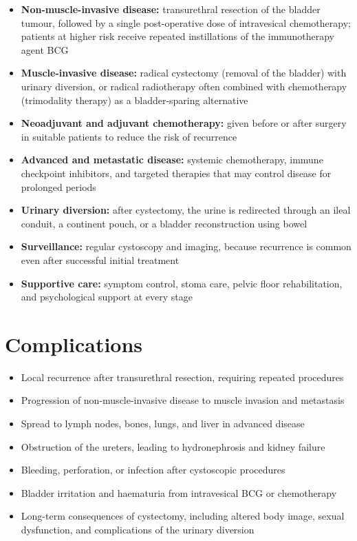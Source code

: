 \begin{itemize}
    \item \textbf{Non-muscle-invasive disease:} transurethral resection of the bladder tumour, followed by a single post-operative dose of intravesical chemotherapy; patients at higher risk receive repeated instillations of the immunotherapy agent BCG
    \item \textbf{Muscle-invasive disease:} radical cystectomy (removal of the bladder) with urinary diversion, or radical radiotherapy often combined with chemotherapy (trimodality therapy) as a bladder-sparing alternative
    \item \textbf{Neoadjuvant and adjuvant chemotherapy:} given before or after surgery in suitable patients to reduce the risk of recurrence
    \item \textbf{Advanced and metastatic disease:} systemic chemotherapy, immune checkpoint inhibitors, and targeted therapies that may control disease for prolonged periods
    \item \textbf{Urinary diversion:} after cystectomy, the urine is redirected through an ileal conduit, a continent pouch, or a bladder reconstruction using bowel
    \item \textbf{Surveillance:} regular cystoscopy and imaging, because recurrence is common even after successful initial treatment
    \item \textbf{Supportive care:} symptom control, stoma care, pelvic floor rehabilitation, and psychological support at every stage
\end{itemize}

\section*{Complications}
\begin{itemize}
    \item Local recurrence after transurethral resection, requiring repeated procedures
    \item Progression of non-muscle-invasive disease to muscle invasion and metastasis
    \item Spread to lymph nodes, bones, lungs, and liver in advanced disease
    \item Obstruction of the ureters, leading to hydronephrosis and kidney failure
    \item Bleeding, perforation, or infection after cystoscopic procedures
    \item Bladder irritation and haematuria from intravesical BCG or chemotherapy
    \item Long-term consequences of cystectomy, including altered body image, sexual dysfunction, and complications of the urinary diversion
\end{itemize}

